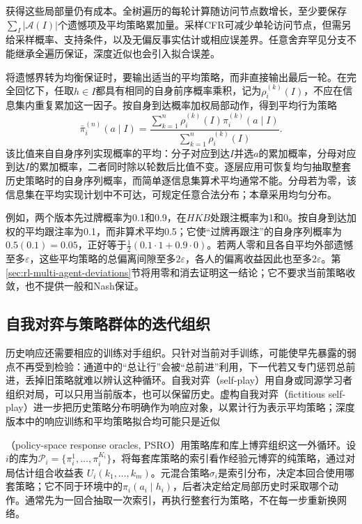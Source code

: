 获得这些局部量仍有成本。全树遍历的每轮计算随访问节点数增长，至少要保存$\sum_I|\mathcal A(I)|$个遗憾项及平均策略累加量。采样CFR可减少单轮访问节点，但需另给采样概率、支持条件，以及无偏反事实估计或相应误差界。任意舍弃罕见分支不能继承全遍历保证，深度近似也会引入拟合误差。

将遗憾界转为均衡保证时，要输出适当的平均策略，而非直接输出最后一轮。在完全回忆下，任取$h\in I$都具有相同的自身前序概率乘积，记为$\rho_i^{(k)}(I)$，不应在信息集内重复累加这一因子。按自身到达概率加权局部动作，得到平均行为策略
\begin{equation}
 \bar\pi_i^{(n)}(a\mid I)=
 \frac{\sum_{k=1}^{n}\rho_i^{(k)}(I)\pi_i^{(k)}(a\mid I)}
      {\sum_{k=1}^{n}\rho_i^{(k)}(I)}.
 \label{eq:rl-multi-agent-average-behavior}
\end{equation}
该比值来自自身序列实现概率的平均：分子对应到达$I$并选$a$的累加概率，分母对应到达$I$的累加概率，二者同时除以轮数后比值不变。逐层应用可恢复均匀抽取整套历史策略时的自身序列概率，而简单逐信息集算术平均通常不能。分母若为零，该信息集在平均实现计划中不可达，可规定任意合法分布；本章采用均匀分布。

例如，两个版本先过牌概率为0.1和0.9，在$HKB$处跟注概率为1和0。按自身到达加权的平均跟注率为0.1，而非算术平均0.5；它使“过牌再跟注”的自身序列概率为$0.5(0.1)=0.05$，正好等于$\tfrac12(0.1\cdot1+0.9\cdot0)$。若两人零和且各自平均外部遗憾至多$\varepsilon$，这些平均策略的总偏离间隙至多$2\varepsilon$，各人的偏离收益因此也至多$2\varepsilon$。第\ref{sec:rl-multi-agent-deviations}节将用零和消去证明这一结论；它不要求当前策略收敛，也不提供一般和Nash保证。

\subsection{自我对弈与策略群体的迭代组织}
\label{sec:rl-multi-agent-population}

历史响应还需要相应的训练对手组织。只针对当前对手训练，可能使早先暴露的弱点不再受到检验：通道中的“总让行”会被“总前进”利用，下一代若又专门惩罚总前进，丢掉旧策略就难以辨认这种循环。自我对弈（self-play）用自身或同源学习者组织对局，可以只用当前版本，也可以保留历史。虚构自我对弈（fictitious self-play）进一步把历史策略分布明确作为响应对象，以累计行为表示平均策略；深度版本中的响应训练和平均策略拟合均可能只是近似

（policy-space response oracles, PSRO）用策略库和库上博弈组织这一外循环。设$i$的库为$\mathcal P_i=\{\pi_i^1,\ldots,\pi_i^{K_i}\}$，将每套库策略的索引看作经验元博弈的纯策略，通过对局估计组合收益表
$U_i(k_1,\ldots,k_m)$。元混合策略$\sigma_i$是索引分布，决定本回合使用哪套策略；它不同于环境中的$\pi_i(a_i\mid h_i)$，后者决定给定局部历史时采取哪个动作。通常先为一回合抽取一次索引，再执行整套行为策略，不在每一步重新换网络。

